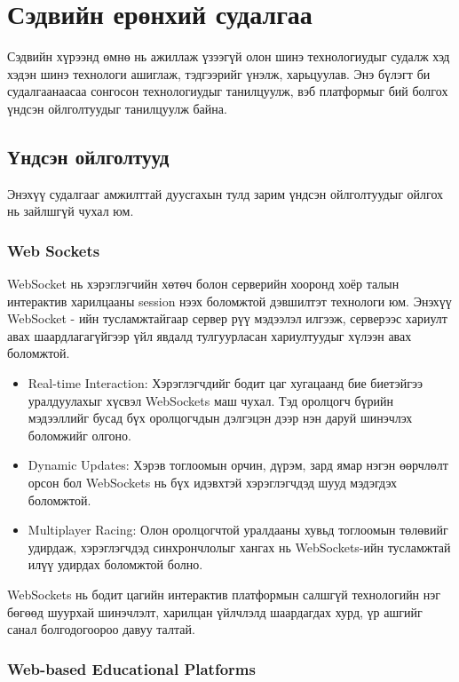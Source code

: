 \chapter{Сэдвийн ерөнхий судалгаа}

Сэдвийн хүрээнд өмнө нь ажиллаж үзээгүй олон шинэ технологиудыг судалж хэд хэдэн шинэ технологи ашиглаж, тэдгээрийг үнэлж, харьцуулав. Энэ бүлэгт би судалгаанаасаа сонгосон технологиудыг танилцуулж, вэб платформыг бий болгох үндсэн ойлголтуудыг танилцуулж байна.

\section{Үндсэн ойлголтууд}

Энэхүү судалгааг амжилттай дуусгахын тулд зарим үндсэн ойлголтуудыг ойлгох нь зайлшгүй чухал юм.

\subsection{Web Sockets}

WebSocket нь хэрэглэгчийн хөтөч болон серверийн хооронд хоёр талын интерактив харилцааны session нээх боломжтой дэвшилтэт технологи юм. Энэхүү WebSocket - ийн тусламжтайгаар сервер рүү мэдээлэл илгээж, серверээс хариулт авах шаардлагагүйгээр үйл явдалд тулгуурласан хариултуудыг хүлээн авах боломжтой.

\begin{itemize}

	\item Real-time Interaction: Хэрэглэгчдийг бодит цаг хугацаанд бие биетэйгээ уралдуулахыг хүсвэл WebSockets маш чухал. Тэд оролцогч бүрийн мэдээллийг бусад бүх оролцогчдын дэлгэцэн дээр нэн даруй шинэчлэх боломжийг олгоно.
	\item Dynamic Updates: Хэрэв тоглоомын орчин, дүрэм, зард ямар нэгэн өөрчлөлт орсон бол WebSockets нь бүх идэвхтэй хэрэглэгчдэд шууд мэдэгдэх боломжтой.
	\item Multiplayer Racing: Олон оролцогчтой уралдааны хувьд тоглоомын төлөвийг удирдаж, хэрэглэгчдэд синхрончлолыг хангах нь WebSockets-ийн тусламжтай илүү удирдах боломжтой болно.
\end{itemize}

WebSockets нь бодит цагийн интерактив платформын салшгүй технологийн нэг бөгөөд шуурхай шинэчлэлт, харилцан үйлчлэлд шаардагдах хурд, үр ашгийг санал болгодогоороо давуу талтай.

\subsection{Web-based Educational Platforms}

